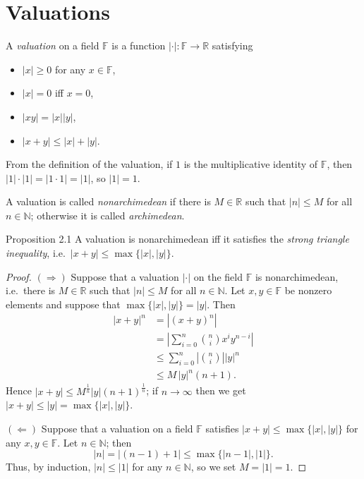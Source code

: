 \documentclass[11pt]{article}
\begin{document}
\section{Valuations}

A \textit{valuation} on a field $\mathbb{F}$ is a function $|\cdot| : \mathbb{F} \rightarrow \mathbb{R}$ satisfying
\begin{itemize}
\item $|x| \geq 0$ for any $x \in \mathbb{F}$,
\item $|x| = 0$ iff $x = 0$,
\item $|xy| = |x||y|$,
\item $|x + y| \leq |x| + |y|$.
\end{itemize}
From the definition of the valuation, if $1$ is the multiplicative identity of $\mathbb{F}$, then $|1|\cdot|1| = |1\cdot 1| = |1|$, so $|1| = 1$.

A valuation is called \textit{nonarchimedean} if there is $M \in \mathbb{R}$ such that $|n| \leq M$ for all $n \in \mathbb{N}$; otherwise it is called \textit{archimedean}.

\begin{thmbox}{Proposition 2.1}
A valuation is nonarchimedean iff it satisfies the \textit{strong triangle inequality}, i.e.\ $|x + y| \leq \max\{|x|, |y|\}$.
\end{thmbox}

\begin{proof}
$(\Rightarrow)$ Suppose that a valuation $|\cdot|$ on the field $\mathbb{F}$ is nonarchimedean, i.e.\ there is $M \in \mathbb{R}$ such that $|n| \leq M$ for all $n \in \mathbb{N}$. Let $x, y \in \mathbb{F}$ be nonzero elements and suppose that $\max\{|x|, |y|\} = |y|$. Then
\[
\begin{aligned}
|x + y|^n &= |(x + y)^n| \\
&= \left| \sum_{i=0}^n \binom{n}{i} x^i y^{n-i} \right| \\
&\leq \sum_{i=0}^n \left| \binom{n}{i} \right| |y|^n \\
&\leq M\, |y|^n (n + 1) .
\end{aligned}
\]
Hence $|x + y| \leq M^{\frac1n} |y| (n + 1)^{\frac1n}$; if $n \rightarrow \infty$ then we get $|x + y| \leq |y| = \max\{|x|, |y|\}$.

$(\Leftarrow)$ Suppose that a valuation on a field $\mathbb{F}$ satisfies $|x + y| \leq \max\{|x|, |y|\}$ for any $x, y \in \mathbb{F}$. Let $n \in \mathbb{N}$; then
\[
|n| = |(n - 1) + 1| \leq \max\{|n - 1|, |1|\} .
\]
Thus, by induction, $|n| \leq |1|$ for any $n \in \mathbb{N}$, so we set $M = |1| = 1$.
\end{proof}
\end{document}

